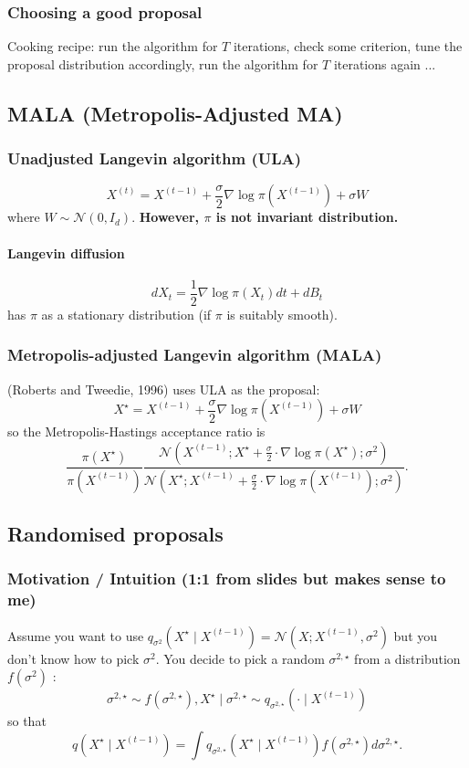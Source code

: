 \documentclass{article}
\begin{document}
\subsubsection{Choosing a good proposal}
Cooking recipe: run the algorithm for $T$ iterations, check some criterion, tune the proposal distribution accordingly, run the algorithm for $T$ iterations again ...


\subsection{MALA (Metropolis-Adjusted MA)}

\subsubsection{Unadjusted Langevin algorithm (ULA)}
$$
X^{(t)}=X^{(t-1)}+\frac{\sigma}{2} \nabla \log \pi\left(X^{(t-1)}\right)+\sigma W
$$
where $W \sim \mathcal{N}\left(0, I_d\right)$. \textbf{However, $\pi$ is not invariant distribution.}

\paragraph{Langevin diffusion}
$$
d X_t=\frac{1}{2} \nabla \log \pi\left(X_t\right) d t+d B_t
$$
has $\pi$ as a stationary distribution (if $\pi$ is suitably smooth).

\subsubsection{Metropolis-adjusted Langevin algorithm (MALA)}
(Roberts and Tweedie, 1996) uses ULA as the proposal:
$$
X^{\star}=X^{(t-1)}+\frac{\sigma}{2} \nabla \log \pi\left(X^{(t-1)}\right)+\sigma W
$$
so the Metropolis-Hastings acceptance ratio is
$$
\frac{\pi\left(X^{\star}\right)}{\pi\left(X^{(t-1)}\right)} \frac{\mathcal{N}\left(X^{(t-1)} ; X^{\star}+\frac{\sigma}{2} \cdot \nabla \log \pi\left(X^{\star}\right) ; \sigma^2\right)}{\mathcal{N}\left(X^{\star} ; X^{(t-1)}+\frac{\sigma}{2} \cdot \nabla \log \pi\left(X^{(t-1)}\right) ; \sigma^2\right)} .
$$

\subsection{Randomised proposals}
\subsubsection{Motivation / Intuition (1:1 from slides but makes sense to me)}
Assume you want to use $q_{\sigma^2}\left(X^{\star} \mid X^{(t-1)}\right)=\mathcal{N}\left(X ; X^{(t-1)}, \sigma^2\right)$ but you don't know how to pick $\sigma^2$. You decide to pick a random $\sigma^{2, \star}$ from a distribution $f\left(\sigma^2\right)$ :
$$
\sigma^{2, \star} \sim f\left(\sigma^{2, \star}\right), X^{\star} \mid \sigma^{2, \star} \sim q_{\sigma^{2, \star}}\left(\cdot \mid X^{(t-1)}\right)
$$
so that
$$
q\left(X^{\star} \mid X^{(t-1)}\right)=\int q_{\sigma^{2, \star}}\left(X^{\star} \mid X^{(t-1)}\right) f\left(\sigma^{2, \star}\right) d \sigma^{2, \star} .
$$
\end{document}
